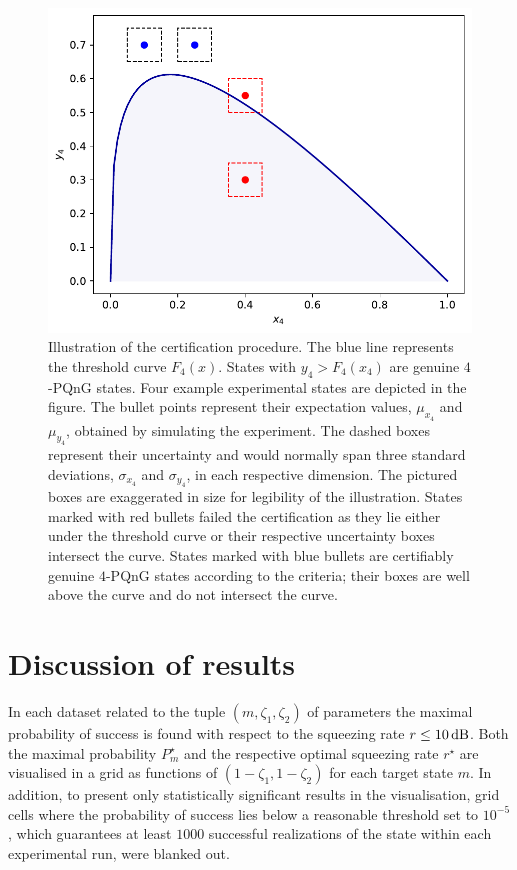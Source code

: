 \documentclass{article}
\begin{document}
\begin{figure}[h]
  \begin{center}
    \includegraphics[width = 0.50 \columnwidth]{import/illustrate_lachman_curve.pdf}
  \end{center}
  \caption{
    Illustration of the certification procedure. The blue line represents the threshold curve $F_{4} (x)$. States with $y_{4} > F_{4}(x_{4})$ are genuine $4$-PQnG states. Four example experimental states are depicted in the figure. The bullet points represent their expectation values, $\mu_{x_{4}}$ and $\mu_{y_{4}}$, obtained by simulating the experiment. The dashed boxes represent their uncertainty and would normally span three standard deviations, $\sigma_{x_{4}}$ and $\sigma_{y_{4}}$, in each respective dimension. The pictured boxes are exaggerated in size for legibility of the illustration. States marked with red bullets failed the certification as they lie either under the threshold curve or their respective uncertainty boxes intersect the curve. States marked with blue bullets are certifiably genuine $4$-PQnG states according to the criteria; their boxes are well above the curve and do not intersect the curve.
  }
  \label{f-otm-il}
\end{figure}

%
%

\FloatBarrier
\section{Discussion of results}

In each dataset related to the tuple $(m, \zeta_{1}, \zeta_{2})$ of parameters the maximal probability of success is found with respect to the squeezing rate ${r \leq 10\,\mathrm{dB}}$. Both the maximal probability $P_{m}^{\star}$ and the respective optimal squeezing rate ${r^{\star}}$ are visualised in a grid as functions of ${(1 - \zeta_{1}, 1 - \zeta_{2})}$ for each target state $m$. In addition, to present only statistically significant results in the visualisation, grid cells where the probability of success lies below a reasonable threshold set to $10^{-5}$, which guarantees at least $1000$ successful realizations of the state within each experimental run, were blanked out.
\end{document}
